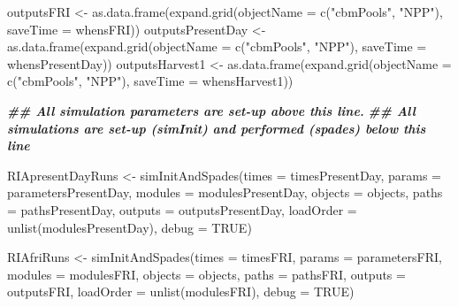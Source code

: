 \documentclass[
]{article}
\newenvironment{Shaded}{\begin{snugshade}}{\end{snugshade}}
\newcommand{\AttributeTok}[1]{\textcolor[rgb]{0.77,0.63,0.00}{#1}}
\newcommand{\ConstantTok}[1]{\textcolor[rgb]{0.00,0.00,0.00}{#1}}
\newcommand{\DocumentationTok}[1]{\textcolor[rgb]{0.56,0.35,0.01}{\textbf{\textit{#1}}}}
\newcommand{\FunctionTok}[1]{\textcolor[rgb]{0.00,0.00,0.00}{#1}}
\newcommand{\NormalTok}[1]{#1}
\newcommand{\OtherTok}[1]{\textcolor[rgb]{0.56,0.35,0.01}{#1}}
\newcommand{\StringTok}[1]{\textcolor[rgb]{0.31,0.60,0.02}{#1}}
\begin{document}
\begin{Shaded}
\begin{Highlighting}[]
\NormalTok{outputsFRI }\OtherTok{\textless{}{-}} \FunctionTok{as.data.frame}\NormalTok{(}\FunctionTok{expand.grid}\NormalTok{(}\AttributeTok{objectName =} \FunctionTok{c}\NormalTok{(}\StringTok{"cbmPools"}\NormalTok{, }\StringTok{"NPP"}\NormalTok{), }\AttributeTok{saveTime =}\NormalTok{ whensFRI))}
\NormalTok{outputsPresentDay }\OtherTok{\textless{}{-}} \FunctionTok{as.data.frame}\NormalTok{(}\FunctionTok{expand.grid}\NormalTok{(}\AttributeTok{objectName =} \FunctionTok{c}\NormalTok{(}\StringTok{"cbmPools"}\NormalTok{, }\StringTok{"NPP"}\NormalTok{), }\AttributeTok{saveTime =}\NormalTok{ whensPresentDay))}
\NormalTok{outputsHarvest1 }\OtherTok{\textless{}{-}} \FunctionTok{as.data.frame}\NormalTok{(}\FunctionTok{expand.grid}\NormalTok{(}\AttributeTok{objectName =} \FunctionTok{c}\NormalTok{(}\StringTok{"cbmPools"}\NormalTok{, }\StringTok{"NPP"}\NormalTok{), }\AttributeTok{saveTime =}\NormalTok{ whensHarvest1))}

\DocumentationTok{\#\# All simulation parameters are set{-}up above this line.}
\DocumentationTok{\#\# All simulations are set{-}up (simInit) and performed (spades) below this line}

\NormalTok{RIApresentDayRuns }\OtherTok{\textless{}{-}} \FunctionTok{simInitAndSpades}\NormalTok{(}\AttributeTok{times =}\NormalTok{ timesPresentDay,}
                               \AttributeTok{params =}\NormalTok{ parametersPresentDay,}
                               \AttributeTok{modules =}\NormalTok{ modulesPresentDay,}
                               \AttributeTok{objects =}\NormalTok{ objects,}
                               \AttributeTok{paths =}\NormalTok{ pathsPresentDay,}
                               \AttributeTok{outputs =}\NormalTok{ outputsPresentDay,}
                               \AttributeTok{loadOrder =} \FunctionTok{unlist}\NormalTok{(modulesPresentDay),}
                               \AttributeTok{debug =} \ConstantTok{TRUE}\NormalTok{)}

\NormalTok{RIAfriRuns }\OtherTok{\textless{}{-}} \FunctionTok{simInitAndSpades}\NormalTok{(}\AttributeTok{times =}\NormalTok{ timesFRI,}
                               \AttributeTok{params =}\NormalTok{ parametersFRI,}
                               \AttributeTok{modules =}\NormalTok{ modulesFRI,}
                               \AttributeTok{objects =}\NormalTok{ objects,}
                               \AttributeTok{paths =}\NormalTok{ pathsFRI,}
                               \AttributeTok{outputs =}\NormalTok{ outputsFRI,}
                               \AttributeTok{loadOrder =} \FunctionTok{unlist}\NormalTok{(modulesFRI),}
                               \AttributeTok{debug =} \ConstantTok{TRUE}\NormalTok{)}


\end{Highlighting}
\end{Shaded}
\end{document}
